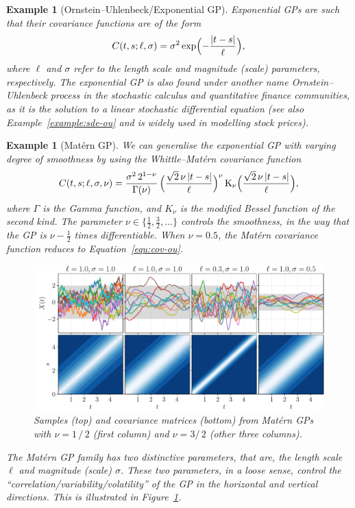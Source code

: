 \documentclass[]{article}
\newtheorem{example}[theorem]{Example}
\begin{document}
\begin{example}[Ornstein--Uhlenbeck/Exponential GP]
	\label{example:ou-gp}
	Exponential GPs are such that their covariance functions are of the form
	\begin{equation}
		C(t, s; \ell, \sigma) = \sigma^2 \exp\Bigl(-\frac{\lvert t-s\rvert}{\ell}\Bigr),
		\label{equ:cov-ou}
	\end{equation}
	where $\ell$ and $\sigma$ refer to the length scale and magnitude (scale) parameters, respectively. The exponential GP is also found under another name Ornstein--Uhlenbeck process in the stochastic calculus and quantitative finance communities, as it is the solution to a linear stochastic differential equation (see also Example~\ref{example:sde-ou} and is widely used in modelling stock prices).
\end{example}

\begin{example}[Mat\'{e}rn GP]
	We can generalise the exponential GP with varying degree of smoothness by using the Whittle--Mat\'{e}rn covariance function
	\begin{equation}
		C(t, s; \ell, \sigma, \nu) = \frac{\sigma^2 \, 2^{{1 - \nu}}}{\Gamma(\nu)} \, \Bigl( \frac{\sqrt{2} \, \nu \, \lvert t - s\rvert}{\ell} \Bigr)^\nu \, \mathrm{K}_{\nu}\Bigl( \frac{\sqrt{2} \, \nu \, \lvert t - s\rvert}{\ell} \Bigr),
		\label{equ:matern-cov}
	\end{equation}
	where $\Gamma$ is the Gamma function, and $K_\nu$ is the modified Bessel function of the second kind. The parameter $\nu \in \lbrace \frac{1}{2}, \frac{3}{2}, \ldots \rbrace$ controls the smoothness, in the way that the GP is $\nu - \frac{1}{2}$ times differentiable. When $\nu = 0.5$, the Mat\'{e}rn covariance function reduces to Equation~\eqref{equ:cov-ou}.
	\begin{figure}[t!]
		\centering
		\includegraphics[width=.99\linewidth]{figs/sample-cov-matern}
		\caption{Samples (top) and covariance matrices (bottom) from Mat\'{e}rn GPs with $\nu=1 \, / \, 2$ (first column) and $\nu=3 / \, 2$ (other three columns).}
		\label{fig:matern}
	\end{figure}
	The Mat\'{e}rn GP family has two distinctive parameters, that are, the length scale $\ell$ and magnitude (scale) $\sigma$. These two parameters, in a loose sense, control the ``correlation/variability/volatility'' of the GP in the horizontal and vertical directions. This is illustrated in Figure~\ref{fig:matern}.
\end{example}
\end{document}

